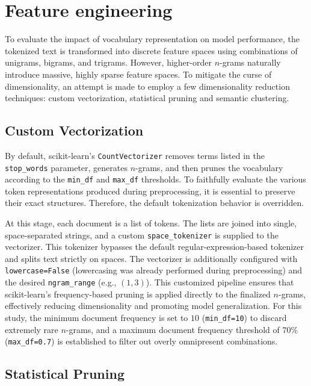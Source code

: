 \documentclass[a4paper,twoside,12pt]{book}
\newcommand{\code}[1]{\texttt{#1}}
\begin{document}
\section{Feature engineering}

To evaluate the impact of vocabulary representation on model performance, the tokenized text is transformed into discrete feature spaces using combinations of unigrams, bigrams, and trigrams. However, higher-order $n$-grams naturally introduce massive, highly sparse feature spaces. To mitigate the curse of dimensionality, an attempt is made to employ a few dimensionality reduction techniques: custom vectorization, statistical pruning and semantic clustering.

\subsection{Custom Vectorization} \label{sec:custom_vec}

By default, scikit-learn's \code{CountVectorizer} removes terms listed in the \code{stop\_words} parameter, generates $n$-grams, and then prunes the vocabulary according to the \code{min\_df} and \code{max\_df} thresholds. To faithfully evaluate the various token representations produced during preprocessing, it is essential to preserve their exact structures. Therefore, the default tokenization behavior is overridden.

At this stage, each document is a list of tokens. The lists are joined into single, space-separated strings, and a custom \code{space\_tokenizer} is supplied to the vectorizer. This tokenizer bypasses the default regular-expression-based tokenizer and splits text strictly on spaces. The vectorizer is additionally configured with \code{lowercase=False} (lowercasing was already performed during preprocessing) and the desired \code{ngram\_range} (e.g., $(1,3)$). This customized pipeline ensures that scikit-learn's frequency-based pruning is applied directly to the finalized $n$-grams, effectively reducing dimensionality and promoting model generalization. For this study, the minimum document frequency is set to $10$ (\code{min\_df=10}) to discard extremely rare $n$-grams, and a maximum document frequency threshold of $70\%$ (\code{max\_df=0.7}) is established to filter out overly omnipresent combinations.

\subsection{Statistical Pruning} \label{sec:stat_pruning}
\end{document}
